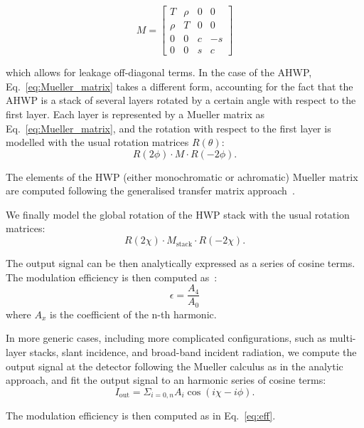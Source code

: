 \begin{equation}\label{eq:Mueller_Matrix}
M=\begin{bmatrix}
   T  &\rho  &0  &0\\
   \rho  &T  &0  &0\\
   0  &0  &c  &-s\\
   0  &0  &s  &c
\end{bmatrix}
\end{equation}

which allows for leakage off-diagonal terms. In the case of the AHWP, Eq.~\ref{eq:Mueller_matrix} takes a different form, accounting for the fact that the AHWP is a stack of several layers rotated by a certain angle with respect to the first layer. Each layer is represented by a Mueller matrix as Eq.~\ref{eq:Mueller_matrix}, and the rotation with respect to the first layer is modelled with the usual rotation matrices $R(\theta)$:
\begin{equation}
R{(2\phi)}\cdot M \cdot R(-2\phi).
\end{equation} 

The elements of the HWP (either monochromatic or achromatic) Mueller matrix are computed following the generalised transfer matrix approach~\cite{Essinger-Hileman_TM}. 

We finally model the global rotation of the HWP stack with the usual rotation matrices:
\begin{equation}
R{(2\chi)}\cdot M_\mathrm{stack} \cdot R(-2\chi).
\end{equation}

The output signal can be then analytically expressed as a series of cosine terms. The modulation efficiency is then computed as~\cite{Hanany:2005vx,Matsumura:2008zx}:
\begin{equation}\label{eq:eff}
\epsilon=\frac{A_4}{A_0}
\end{equation}
where $A_x$ is the coefficient of the n-th harmonic.

In more generic cases, including more complicated configurations, such as multi-layer stacks, slant incidence, and broad-band incident radiation, we compute the output signal at the detector following the Mueller calculus as in the analytic approach, and fit the output signal to an harmonic series of cosine terms:
\begin{equation}
I_\mathrm{out}=\Sigma_{i=0,n} A_i \cos(i\chi-i\phi).
\end{equation}

The modulation efficiency is then computed as in Eq.~\ref{eq:eff}. %

